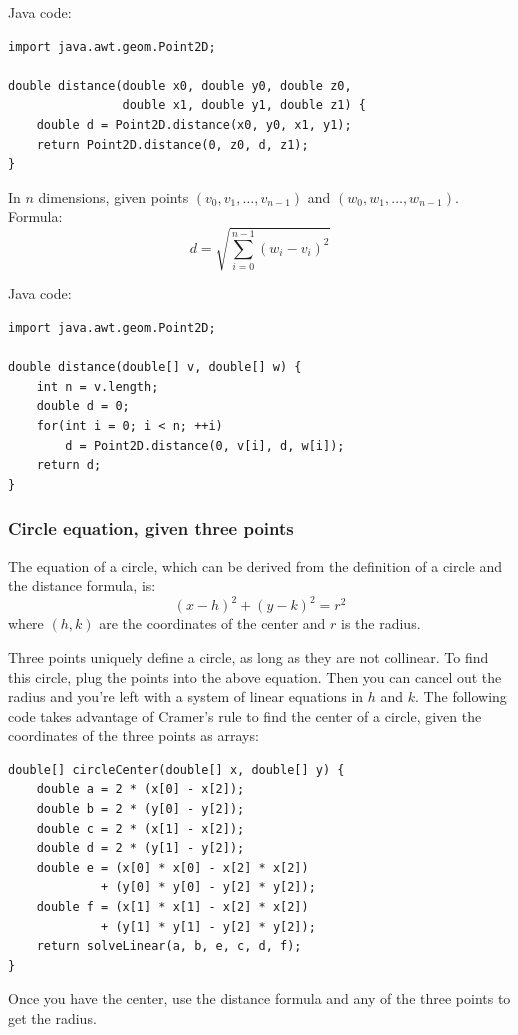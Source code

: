 \documentclass[a4paper,12pt]{article}
\begin{document}
\noindent Java code:
\begin{lstlisting}
import java.awt.geom.Point2D;

double distance(double x0, double y0, double z0,
                double x1, double y1, double z1) {
	double d = Point2D.distance(x0, y0, x1, y1);
	return Point2D.distance(0, z0, d, z1);
}
\end{lstlisting}

\noindent In $n$ dimensions, given points $(v_0, v_1, \ldots, v_{n-1})$ and $(w_0, w_1, \ldots, w_{n-1})$. \\ Formula:
\[ d = \sqrt{\sum_{i=0}^{n-1}{(w_i - v_i)^2}} \]

\noindent Java code:
\begin{lstlisting}
import java.awt.geom.Point2D;

double distance(double[] v, double[] w) {
	int n = v.length;
	double d = 0;
	for(int i = 0; i < n; ++i)
		d = Point2D.distance(0, v[i], d, w[i]);
	return d;
}
\end{lstlisting}

\subsubsection{Circle equation, given three points}
\noindent The equation of a circle, which can be derived from the definition of a circle and the distance formula, is:
\[(x-h)^2+(y-k)^2=r^2\]
\noindent where $(h,k)$ are the coordinates of the center and $r$ is the radius.

Three points uniquely define a circle, as long as they are not collinear. To find this circle, plug the points into the above equation. Then you can cancel out the radius and you're left with a system of linear equations in $h$ and $k$. The following code takes advantage of Cramer's rule to find the center of a circle, given the coordinates of the three points as arrays:

\begin{lstlisting}
double[] circleCenter(double[] x, double[] y) {
	double a = 2 * (x[0] - x[2]);
	double b = 2 * (y[0] - y[2]);
	double c = 2 * (x[1] - x[2]);
	double d = 2 * (y[1] - y[2]);
	double e = (x[0] * x[0] - x[2] * x[2])
	         + (y[0] * y[0] - y[2] * y[2]);
	double f = (x[1] * x[1] - x[2] * x[2])
	         + (y[1] * y[1] - y[2] * y[2]);
	return solveLinear(a, b, e, c, d, f);
}
\end{lstlisting}

Once you have the center, use the distance formula and any of the three points to get the radius.
\end{document}
